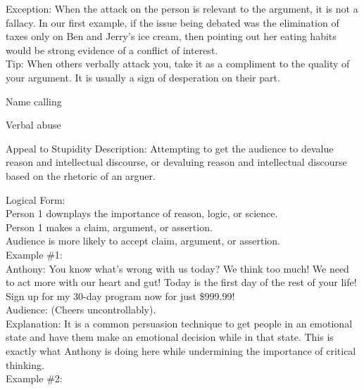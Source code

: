 \documentclass[a4paper,12pt,single,pdftex]{scrartcl}
\begin{document}
{    
      Exception: When the attack on the person is relevant to the argument, it is not a fallacy.  In our first example, if the issue being debated was the elimination of taxes only on Ben and Jerry’s ice cream, then pointing out her eating habits would be strong evidence of a conflict of interest.
    \\

    
      Tip: When others verbally attack you, take it as a compliment to the quality of your argument.  It is usually a sign of desperation on their part.
    \\

  }


Name calling

Verbal abuse

Appeal to Stupidity
    Description: Attempting to get the audience to devalue reason and intellectual discourse, or devaluing reason and intellectual discourse based on the rhetoric of an arguer.

    
      Logical Form:
    \\

    
      Person 1 downplays the importance of reason, logic, or science.
    \\

    
      Person 1 makes a claim, argument, or assertion.
    \\

    
      Audience is more likely to accept claim, argument, or assertion.
    \\

    
      Example \#1:
    \\

    
      Anthony: You know what's wrong with us today? We think too much! We need to act more with our heart and gut! Today is the first day of the rest of your life! Sign up for my 30-day program now for just \$999.99!
    \\

    
      Audience: (Cheers uncontrollably).
    \\

    
      Explanation: It is a common persuasion technique to get people in an emotional state and have them make an emotional decision while in that state. This is exactly what Anthony is doing here while undermining the importance of critical thinking.
    \\

    
      Example \#2:
    \\
\end{document}
